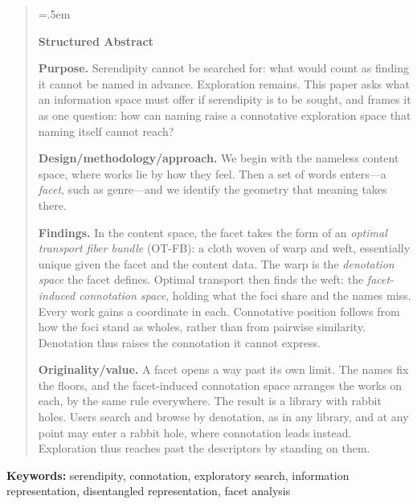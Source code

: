 \documentclass[11pt,a4paper]{article}
\begin{document}
\begin{quote}\parindent=0pt\parskip=.5em\noindent
    \begin{center}
        \textbf{Structured Abstract}
    \end{center}
    \textbf{Purpose.}
    Serendipity cannot be searched for: what would count as finding it cannot
    be named in advance. Exploration remains. This paper asks what an
    information space must offer if serendipity is to be sought, and frames it
    as one question: how can naming raise a connotative exploration space that
    naming itself cannot reach?

    \textbf{Design/methodology/approach.}
    We begin with the nameless content space, where works lie by
    how they feel. Then a set of words enters---a \textit{facet}, such as
    genre---and we identify the geometry that meaning takes there.

    \textbf{Findings.}
    In the content space, the facet takes the form of an \textit{optimal
        transport fiber bundle} (OT-FB): a cloth woven of warp and weft,
    essentially unique given the facet and the content data. The warp is the
    \textit{denotation space} the facet defines. Optimal transport then finds
    the weft: the \textit{facet-induced connotation space}, holding what the
    foci share and the names miss. Every work gains a coordinate in each.
    Connotative position follows from how the foci stand as wholes, rather
    than from pairwise similarity. Denotation thus raises the connotation it
    cannot express.

    \textbf{Originality/value.}
    A facet opens a way past its own limit. The names fix the floors, and the
    facet-induced connotation space arranges the works on each, by the same
    rule everywhere. The result is a library with rabbit holes. Users search
    and browse by denotation, as in any library, and at any point may enter a
    rabbit hole, where connotation leads instead. Exploration thus reaches
    past the descriptors by standing on them.
\end{quote}

\noindent\textbf{Keywords:}
serendipity, connotation, exploratory search, information representation,
disentangled representation, facet analysis














\appendix

\end{document}
